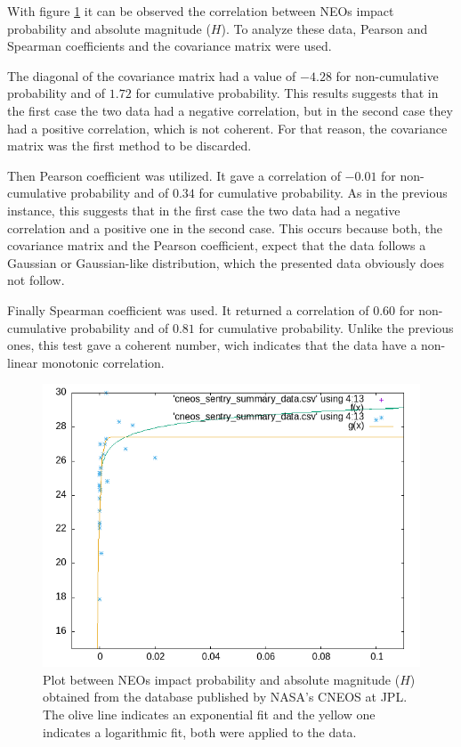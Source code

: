\documentclass[
	a4paper, %
	10pt, %
	unnumberedsections, %
	twoside, %
]{LTJournalArticle}
\begin{document}
With figure \ref{fig:probability} it can be observed the correlation between NEOs impact probability
and absolute magnitude ($H$). To analyze these data, Pearson and Spearman coefficients and the
covariance matrix were used. 

The diagonal of the covariance matrix had a value of $-4.28$ for non-cumulative probability and of 
$1.72$ for cumulative probability. This results suggests that in the first case the two data had a
negative correlation, but in the second case they had a positive correlation, which is not coherent.
For that reason, the covariance matrix was the first method to be discarded.

Then Pearson coefficient was utilized. It gave a correlation of $-0.01$ for non-cumulative
probability and of $0.34$ for cumulative probability. As in the previous instance, this suggests that
in the first case the two data had a negative correlation and a positive one in the second case. This
occurs because both, the covariance matrix and the Pearson coefficient, expect that the data follows
a Gaussian or Gaussian-like distribution, which the presented data obviously does not follow.

Finally Spearman coefficient was used. It returned a correlation of $0.60$ for non-cumulative
probability and of $0.81$ for cumulative probability. Unlike the previous ones, this test gave a
coherent number, wich indicates that the data have a non-linear monotonic correlation. 

\begin{figure}[H] %
	\includegraphics[width=\linewidth]{correlation.png}
	\caption{Plot between NEOs impact probability and absolute magnitude ($H$) obtained from the database published by NASA’s CNEOS at JPL. The olive line indicates an exponential fit and the yellow one indicates a logarithmic fit, both were applied to the data.}
	\label{fig:probability}
\end{figure}
\end{document}
